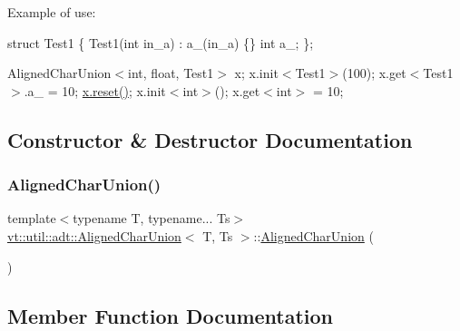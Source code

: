 Example of use\+:

struct Test1 \{ Test1(int in\+\_\+a) \+: a\+\_\+(in\+\_\+a) \{\} int a\+\_\+; \};

Aligned\+Char\+Union$<$int, float, Test1$>$ x; x.\+init$<$\+Test1$>$(100); x.\+get$<$\+Test1$>$.\+a\+\_\+ = 10; \hyperlink{namespacevt_1_1debug_a4456c051bd468fe024334f24887867af}{x.\+reset()}; x.\+init$<$int$>$(); x.\+get$<$int$>$ = 10; 

\subsection{Constructor \& Destructor Documentation}
\mbox{\label{structvt_1_1util_1_1adt_1_1_aligned_char_union_a8d0afe238f4a44735bb37be847f55c45}} 
\subsubsection{\texorpdfstring{Aligned\+Char\+Union()}{AlignedCharUnion()}}
{\footnotesize\ttfamily template$<$typename T, typename... Ts$>$ \\
\hyperlink{structvt_1_1util_1_1adt_1_1_aligned_char_union}{vt\+::util\+::adt\+::\+Aligned\+Char\+Union}$<$ T, Ts $>$\+::\hyperlink{structvt_1_1util_1_1adt_1_1_aligned_char_union}{Aligned\+Char\+Union} (\begin{DoxyParamCaption}{ }\end{DoxyParamCaption})\hspace{0.3cm}{\ttfamily [default]}}



\subsection{Member Function Documentation}
\mbox{\label{structvt_1_1util_1_1adt_1_1_aligned_char_union_ac2ba0a705e45724c9882b904b5c1231b}} 
